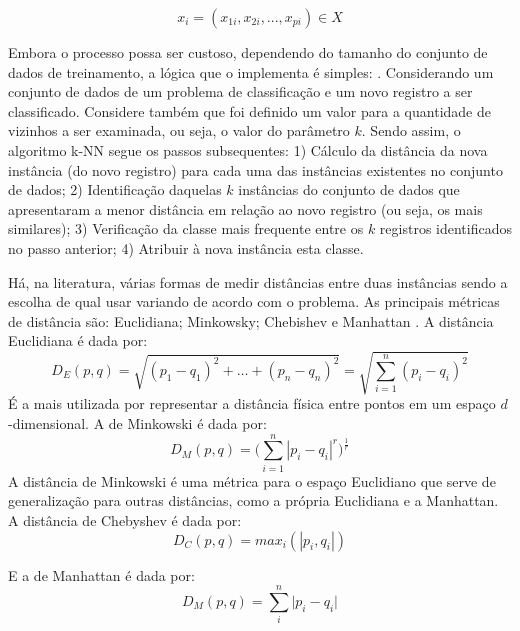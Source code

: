 \begin{equation}\label{eq:vetor-pdimensional}
x_{i}=(x_{1i},x_{2i},...,x_{pi})\in X
\end{equation}

Embora o processo possa ser custoso, dependendo do tamanho do conjunto de dados de treinamento, a lógica que o implementa é simples: \cite{Boscarioli2017} \cite{bruce_estatistica_2019} \cite{goldschmidt2005}. Considerando um conjunto de dados de um problema de classificação e um novo registro a ser classificado. Considere também que foi definido um valor para a quantidade de vizinhos a ser examinada, ou seja, o valor do parâmetro $ k $. Sendo assim, o algoritmo k-NN segue os passos subsequentes: 1) Cálculo da distância da nova instância (do novo registro) para cada uma das instâncias existentes no conjunto de dados; 	2) Identificação daquelas $k$ instâncias do conjunto de dados que apresentaram a menor distância em relação ao novo registro (ou seja, os mais similares);	3) Verificação da classe mais frequente entre os $ k $ registros identificados no passo anterior; 4) Atribuir à nova instância esta classe.

Há, na literatura, várias formas de medir distâncias entre duas instâncias sendo a escolha de qual usar variando de acordo com o problema. As principais métricas de distância são: Euclidiana; Minkowsky; Chebishev e Manhattan \cite{Boscarioli2017, alpaydin_introduction_2014, classification2013}.
A distância Euclidiana é dada por:
\begin{equation}\label{eq:euclidiana}
D_E(p,q) = \sqrt{(p_1 - q_1)^2 + \dots + (p_n - q_n)^2} = \sqrt{\sum_{i=1}^n (p_i - q_i)^2}
\end{equation}
É a mais utilizada por representar a distância física entre pontos em um espaço $d$-dimensional. A de Minkowski é dada por:
\begin{equation}\label{eq:minkowiski}
D_M(p,q) =  \Big(\sum_{i=1}^n |p_i-q_i|^r \Big) ^\frac{1}{r}
\end{equation}
A distância de Minkowski é uma métrica para o espaço Euclidiano que serve de generalização para outras distâncias, como a própria Euclidiana e a Manhattan. A distância de Chebyshev é dada por:
\begin{equation}\label{eq:chebyshev}
D_C(p,q) = max_i(|p_i, q_i|)
\end{equation}

E a de Manhattan é dada por:
\begin{equation}\label{eq:manhattan}
D_M(p,q) = \sum_{i}^{n} \big| p_i - q_i \big| 
\end{equation}

